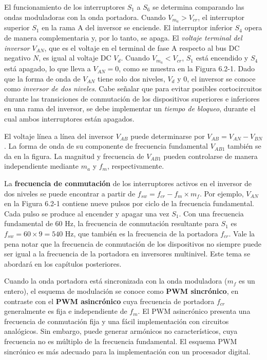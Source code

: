 \documentclass[letterpaper,12pt]{article}
\begin{document}
El funcionamiento de los interruptores $S_1$ a $S_6$ se determina comparando las ondas moduladoras con la onda portadora. Cuando $V_{m_a} > V_{cr}$, el interruptor superior $S_1$ en la rama A del inversor se enciende. El interruptor inferior $S_4$ opera de manera complementaria y, por lo tanto, se apaga. El \textit{voltaje terminal del inversor} $V_{AN}$, que es el voltaje en el terminal de fase A respecto al bus DC negativo $N$, es igual al voltaje DC $V_d$. Cuando $V_{m_a} < V_{cr}$, $S_1$ está encendido y $S_4$ está apagado, lo que lleva a $V_{AN} = 0$, como se muestra en la Figura 6.2-1. Dado que la forma de onda de $V_{AN}$ tiene solo dos niveles, $V_d$ y 0, el inversor se conoce como \textit{inversor de dos niveles}. Cabe señalar que para evitar posibles cortocircuitos durante las transiciones de conmutación de los dispositivos superiores e inferiores en una rama del inversor, se debe implementar un \textit{tiempo de bloqueo}, durante el cual ambos interruptores están apagados.

El voltaje línea a línea del inversor $V_{AB}$ puede determinarse por $V_{AB} = V_{AN} - V_{BN}$. La forma de onda de su componente de frecuencia fundamental $V_{AB1}$ también se da en la figura. La magnitud y frecuencia de $V_{AB1}$ pueden controlarse de manera independiente mediante $m_a$ y $f_m$, respectivamente.

La \textbf{frecuencia de conmutación} de los interruptores activos en el inversor de dos niveles se puede encontrar a partir de $f_{sw} = f_{cr} - f_m \times m_f$. Por ejemplo, $V_{AN}$ en la Figura 6.2-1 contiene nueve pulsos por ciclo de la frecuencia fundamental. Cada pulso se produce al encender y apagar una vez $S_1$. Con una frecuencia fundamental de 60 Hz, la frecuencia de conmutación resultante para $S_1$ es $f_{sw} = 60 \times 9 = 540$ Hz, que también es la frecuencia de la portadora $f_{cr}$. Vale la pena notar que la frecuencia de conmutación de los dispositivos no siempre puede ser igual a la frecuencia de la portadora en inversores multinivel. Este tema se abordará en los capítulos posteriores.

Cuando la onda portadora está sincronizada con la onda moduladora ($m_f$ es un entero), el esquema de modulación se conoce como \textbf{PWM sincrónico}, en contraste con el \textbf{PWM asincrónico} cuya frecuencia de portadora $f_{cr}$ generalmente es fija e independiente de $f_m$. El PWM asincrónico presenta una frecuencia de conmutación fija y una fácil implementación con circuitos analógicos. Sin embargo, puede generar armónicos no característicos, cuya frecuencia no es múltiplo de la frecuencia fundamental. El esquema PWM sincrónico es más adecuado para la implementación con un procesador digital.
\end{document}
